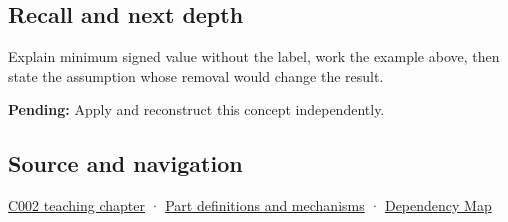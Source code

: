 \subsection{Recall and next depth}\label{appendix-05f39b10364d-recall-and-next-depth}

Explain minimum signed value without the label, work the example above, then state the assumption whose removal would change the result.

\textbf{Pending:} Apply and reconstruct this concept independently.

\subsection{Source and navigation}\label{appendix-05f39b10364d-source-and-navigation}

\hyperref[01-foundations-i-ch001-arithmetic-becomes-a-policy]{C002 teaching chapter} · \hyperref[appendix-fd090d982a15]{Part definitions and mechanisms} · \hyperref[appendix-4ad47bdd269a]{Dependency Map}
